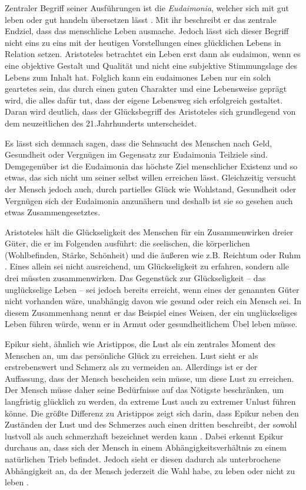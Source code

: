 Zentraler Begriff seiner Ausführungen ist die \textit{Eudaimonia}, welcher sich mit \glqq gut leben\grqq{} oder \glqq gut handeln\grqq{} übersetzen lässt \cite[S.\,5]{MF93}.
Mit ihr beschreibt er das zentrale Endziel, dass das menschliche Leben ausmache. 
Jedoch lässt sich dieser Begriff nicht eins zu eins mit der heutigen Vorstellungen eines glücklichen Lebens in Relation setzen.
Aristoteles betrachtet ein Leben erst dann als eudaimon, wenn es eine \glqq objektive Gestalt und Qualität und nicht eine subjektive Stimmungslage des Lebens zum Inhalt hat.\grqq{} \cite[S.\,5]{MF93}
 Folglich kann ein eudaimones Leben nur ein solch geartetes sein, das durch einen guten Charakter und eine Lebensweise geprägt wird, die alles dafür tut, dass der eigene Lebensweg sich erfolgreich gestaltet. 
 Daran wird deutlich, dass der Glücksbegriff des Aristoteles sich grundlegend von dem neuzeitlichen des 21.Jahrhunderts unterscheidet.
 
Es lässt sich demnach sagen, dass die Sehnsucht des Menschen nach Geld, Gesundheit oder Vergnügen im Gegensatz zur Eudaimonia Teilziele sind. 
Demgegenüber ist die Eudaimonia das höchste Ziel menschlicher Existenz und so etwas, das sich nicht um seiner selbst willen erreichen lässt. 
Gleichzeitig versucht der Mensch jedoch auch, durch partielles Glück wie Wohlstand, Gesundheit oder Vergnügen sich der Eudaimonia anzunähern und deshalb ist sie so gesehen auch etwas Zusammengesetztes. 

Aristoteles hält die Glückseligkeit des Menschen für ein Zusammenwirken dreier Güter, die er im Folgenden ausführt: die seelischen, die körperlichen (Wohlbefinden, Stärke, Schönheit) und die äußeren wie z.B. Reichtum oder Ruhm \cite[S.\,257f]{AD67}.
Eines allein sei nicht ausreichend, um Glückseligkeit zu erfahren, sondern alle drei müssten zusammenwirken. 
Das Gegenstück zur Glückseligkeit -- das unglückselige Leben -- sei jedoch bereits erreicht, wenn eines der genannten Güter nicht vorhanden wäre, unabhängig davon wie gesund oder reich ein Mensch sei. 
In diesem Zusammenhang nennt er das Beispiel eines Weisen, der ein unglückseliges Leben führen würde, wenn er in Armut oder gesundheitlichem Übel leben müsse.

Epikur sieht, ähnlich wie Aristippos, die Lust als ein zentrales Moment des Menschen an, um das persönliche Glück zu erreichen. 
Lust sieht er als erstrebenswert und Schmerz als zu vermeiden an. 
Allerdings ist er der Auffassung, dass der Mensch bescheiden sein müsse, um diese Lust zu erreichen.
Der Mensch müsse daher seine Bedürfnisse auf das Nötigste beschränken, um langfristig glücklich zu werden, da extreme Lust auch zu extremer Unlust führen könne.
Die größte Differenz zu Aristippos zeigt sich darin, dass Epikur neben den Zuständen der Lust und des Schmerzes auch einen dritten beschreibt, der sowohl lustvoll als auch schmerzhaft bezeichnet werden kann \cite[S.\,32]{MF93}. 
Dabei erkennt Epikur durchaus an, dass sich der Mensch in einem Abhängigkeitsverhältnis zu einem natürlichen Trieb befindet. 
Jedoch sieht er diesen dadurch als unterbrochene Abhängigkeit an, da der Mensch jederzeit die Wahl habe, zu leben oder nicht zu leben \cite[S.\,36]{MF93}.

